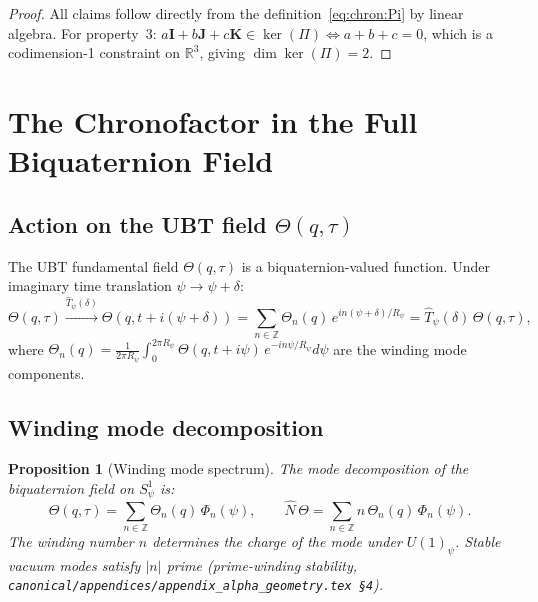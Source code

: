 \documentclass[12pt,a4paper]{article}
\newtheorem{proposition}[theorem]{Proposition}
\theoremstyle{definition}
\theoremstyle{remark}
\begin{document}
\begin{proof}
All claims follow directly from the definition~\eqref{eq:chron:Pi} by linear algebra.
For property~3: $a\mathbf{I}+b\mathbf{J}+c\mathbf{K} \in \ker(\Pi) \Leftrightarrow a+b+c=0$,
which is a codimension-1 constraint on $\mathbb{R}^3$, giving $\dim\ker(\Pi) = 2$.
\end{proof}

\section{The Chronofactor in the Full Biquaternion Field}
\label{sec:chron:field}

\subsection{Action on the UBT field $\Theta(q,\tau)$}

The UBT fundamental field $\Theta(q,\tau)$ is a biquaternion-valued function.
Under imaginary time translation $\psi \to \psi + \delta$:
\begin{equation}
  \Theta(q,\tau) \xrightarrow{\hat{T}_\psi(\delta)}
  \Theta(q, t + i(\psi+\delta))
  = \sum_{n \in \mathbb{Z}} \Theta_n(q)\,e^{in(\psi+\delta)/R_\psi}
  = \hat{T}_\psi(\delta)\,\Theta(q,\tau),
  \label{eq:chron:field_action}
\end{equation}
where $\Theta_n(q) = \frac{1}{2\pi R_\psi}\int_0^{2\pi R_\psi}\Theta(q,t+i\psi)\,e^{-in\psi/R_\psi}d\psi$
are the winding mode components.

\subsection{Winding mode decomposition}

\begin{proposition}[Winding mode spectrum]
\label{prop:chron:winding_spectrum}
The mode decomposition of the biquaternion field on $S^1_\psi$ is:
\begin{equation}
  \Theta(q,\tau)
  = \sum_{n \in \mathbb{Z}} \Theta_n(q)\,\Phi_n(\psi),
  \qquad
  \hat{N}\,\Theta = \sum_{n \in \mathbb{Z}} n\,\Theta_n(q)\,\Phi_n(\psi).
  \label{eq:chron:mode_decomp}
\end{equation}
The winding number $n$ determines the charge of the mode under $U(1)_\psi$.
Stable vacuum modes satisfy $|n|$ prime (prime-winding stability,
\texttt{canonical/appendices/appendix\_alpha\_geometry.tex \S4}).
\end{proposition}
\end{document}
